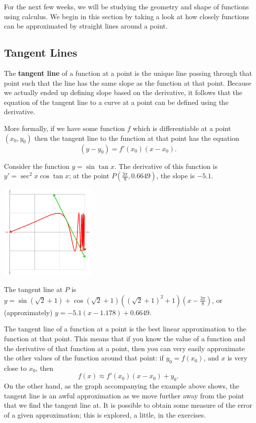 


For the next few weeks, we will be studying the geometry and shape of functions using calculus. We begin in
this section by taking a look at how closely functions can be approximated by straight lines around a point.

\subsection*{Tangent Lines}
The \textbf{tangent line} of a function at a point is the unique line passing through that point such that the
line has the same slope as the function at that point. Because we actually ended up defining slope based
on the derivative, it follows that the equation of the tangent line to a curve at a point can be defined
using the derivative.

More formally, if we have some function $ f $ which is differentiable at a point $ (x_0, y_0) $ then the
tangent line to the function at that point has the equation
\begin{displaymath}
  (y - y_0) = f'(x_0) (x - x_0).
\end{displaymath}

\begin{ex}
  Consider the function $ y = \sin \tan x $. The derivative of this function is $ y' = \sec^2 x \cos \tan x $;
  at the point $ P(\frac{3\pi}{8}, 0.6649) $, the slope is $ -5.1 $.
  \begin{center}
    \includegraphics[width=0.35\textwidth]{tangentex}
  \end{center}

  The tangent line at $ P $ is $ y = \sin(\sqrt{2} + 1) + \cos(\sqrt{2} + 1)((\sqrt{2} + 1)^2 + 1)(x - \frac{3\pi}{8}) $, or
  (approximately) $ y = -5.1(x - 1.178) + 0.6649 $.
\end{ex}

The tangent line of a function at a point is the best linear approximation to the function at that point. This
means that if you know the value of a function and the derivative of that function at a point, then you can very
easily approximate the other values of the function around that point: if $ y_0 = f(x_0) $, and $ x $ is very
close to $ x_0 $, then
\begin{displaymath}
f(x) \approx f'(x_0)(x - x_0) + y_0.
\end{displaymath}
On the other hand, as the graph accompanying the example above shows, the tangent line is an awful approximation as
we move further away from the point that we find the tangent line at. It is possible to obtain some measure of the
error of a given approximation; this is explored, a little, in the exercises.

